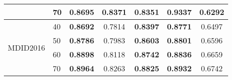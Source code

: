 \documentclass{article}
\begin{document}
\begin{table}
\begin{tabular}{||l|l||ccccc||}
\cmidrule{2-7}
&70&\textcolor[rgb]{0,0,1}{\textbf{0.8695}}&\textbf{0.8371}&0.8351&\textcolor[rgb]{1,0,0}{\textbf{0.9337}}&0.6292\\
\midrule \midrule
\multirow{4}{*}{\begin{turn}{-90}MDID2016\end{turn}}&40&\textcolor[rgb]{0,0,1}{\textbf{0.8692}}&0.7814&\textbf{0.8397}&\textcolor[rgb]{1,0,0}{\textbf{0.8771}}&0.6497\\
\cmidrule{2-7}
&50&\textcolor[rgb]{0,0,1}{\textbf{0.8786}}&0.7983&\textbf{0.8603}&\textcolor[rgb]{1,0,0}{\textbf{0.8801}}&0.6596\\
\cmidrule{2-7}
&60&\textcolor[rgb]{1,0,0}{\textbf{0.8898}}&0.8118&\textbf{0.8742}&\textcolor[rgb]{0,0,1}{\textbf{0.8836}}&0.6659\\
\cmidrule{2-7}
&70&\textcolor[rgb]{1,0,0}{\textbf{0.8964}}&0.8263&\textbf{0.8825}&\textcolor[rgb]{0,0,1}{\textbf{0.8932}}&0.6742\\
\midrule \midrule
\end{tabular}
\end{table}
\end{document}

